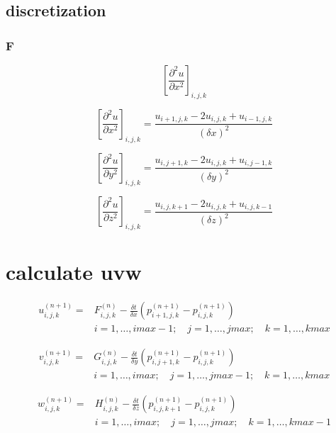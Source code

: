 \documentclass[10pt]{article}
\begin{document}
\subsection{discretization}
\subsubsection{F}

\begin{equation}
\left[\frac{\partial^2 u}{\partial x^2}\right]_{i,j,k}
\end{equation}

\begin{equation}
\left[\frac{\partial^2 u}{\partial x^2}\right]_{i,j,k} =
\frac{u_{i+1,j,k} - 2u_{i,j,k} + u_{i-1,j,k}}{(\delta x)^2}
\end{equation}

\begin{equation}
\left[\frac{\partial^2 u}{\partial y^2}\right]_{i,j,k} =
\frac{u_{i,j+1,k} - 2u_{i,j,k} + u_{i,j-1,k}}{(\delta y)^2}
\end{equation}

\begin{equation}
\left[\frac{\partial^2 u}{\partial z^2}\right]_{i,j,k} =
\frac{u_{i,j,k+1} - 2u_{i,j,k} + u_{i,j,k-1}}{(\delta z)^2}
\end{equation}


\section{calculate uvw}
\begin{equation}
\begin{split}
u^{(n+1)}_{i,j,k} = & F^{(n)}_{i,j,k} - \frac{\delta t}{\delta x}\left(p^{(n+1)}_{i+1,j,k} - p^{(n+1)}_{i,j,k}\right)\\
& i = 1,\ldots,imax-1; \quad j = 1,\ldots,jmax; \quad k = 1,\ldots,kmax
\end{split}
\end{equation}

\begin{equation}
\begin{split}
v^{(n+1)}_{i,j,k} = & G^{(n)}_{i,j,k} - \frac{\delta t}{\delta y}\left(p^{(n+1)}_{i,j+1,k} - p^{(n+1)}_{i,j,k}\right)\\
& i = 1,\ldots,imax; \quad j = 1,\ldots,jmax-1; \quad k = 1,\ldots,kmax
\end{split}
\end{equation}

\begin{equation}
\begin{split}
w^{(n+1)}_{i,j,k} = & H^{(n)}_{i,j,k} - \frac{\delta t}{\delta z}\left(p^{(n+1)}_{i,j,k+1} - p^{(n+1)}_{i,j,k}\right)\\
& i = 1,\ldots,imax; \quad j = 1,\ldots,jmax; \quad k = 1,\ldots,kmax-1
\end{split}
\end{equation}
\end{document}
